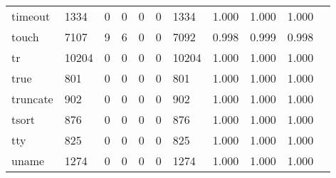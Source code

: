 \begin{longtable}{lp{1.10cm}p{1.10cm}p{1.10cm}p{1.10cm}p{1.10cm}p{1.10cm}p{1.10cm}p{1.10cm}p{1.10cm}p{1.10cm}}
timeout   &                   1334 &                                  0 &                                 0 &                                0 &                                 0 &                            1334 &                             1.000 &                                 1.000 &                               1.000 \\
touch     &                   7107 &                                  9 &                                 6 &                                0 &                                 0 &                            7092 &                             0.998 &                                 0.999 &                               0.998 \\
tr        &                  10204 &                                  0 &                                 0 &                                0 &                                 0 &                           10204 &                             1.000 &                                 1.000 &                               1.000 \\
true      &                    801 &                                  0 &                                 0 &                                0 &                                 0 &                             801 &                             1.000 &                                 1.000 &                               1.000 \\
truncate  &                    902 &                                  0 &                                 0 &                                0 &                                 0 &                             902 &                             1.000 &                                 1.000 &                               1.000 \\
tsort     &                    876 &                                  0 &                                 0 &                                0 &                                 0 &                             876 &                             1.000 &                                 1.000 &                               1.000 \\
tty       &                    825 &                                  0 &                                 0 &                                0 &                                 0 &                             825 &                             1.000 &                                 1.000 &                               1.000 \\
uname     &                   1274 &                                  0 &                                 0 &                                0 &                                 0 &                            1274 &                             1.000 &                                 1.000 &                               1.000 \\

\end{longtable}
